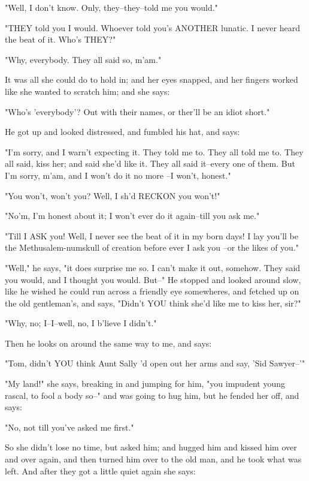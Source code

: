 "Well, I don't know.  Only, they--they--told me you would."

"THEY told you I would.  Whoever told you's ANOTHER lunatic.  I never
heard the beat of it.  Who's THEY?"

"Why, everybody.  They all said so, m'am."

It was all she could do to hold in; and her eyes snapped, and her fingers
worked like she wanted to scratch him; and she says:

"Who's 'everybody'?  Out with their names, or ther'll be an idiot short."

He got up and looked distressed, and fumbled his hat, and says:

"I'm sorry, and I warn't expecting it.  They told me to.  They all told
me to.  They all said, kiss her; and said she'd like it.  They all said
it--every one of them.  But I'm sorry, m'am, and I won't do it no more
--I won't, honest."

"You won't, won't you?  Well, I sh'd RECKON you won't!"

"No'm, I'm honest about it; I won't ever do it again--till you ask me."

"Till I ASK you!  Well, I never see the beat of it in my born days!  I
lay you'll be the Methusalem-numskull of creation before ever I ask you
--or the likes of you."

"Well," he says, "it does surprise me so.  I can't make it out, somehow.
They said you would, and I thought you would.  But--" He stopped and
looked around slow, like he wished he could run across a friendly eye
somewheres, and fetched up on the old gentleman's, and says, "Didn't YOU
think she'd like me to kiss her, sir?"

"Why, no; I--I--well, no, I b'lieve I didn't."

Then he looks on around the same way to me, and says:

"Tom, didn't YOU think Aunt Sally 'd open out her arms and say, 'Sid
Sawyer--'"

"My land!" she says, breaking in and jumping for him, "you impudent young
rascal, to fool a body so--" and was going to hug him, but he fended her
off, and says:

"No, not till you've asked me first."

So she didn't lose no time, but asked him; and hugged him and kissed him
over and over again, and then turned him over to the old man, and he took
what was left.  And after they got a little quiet again she says:

